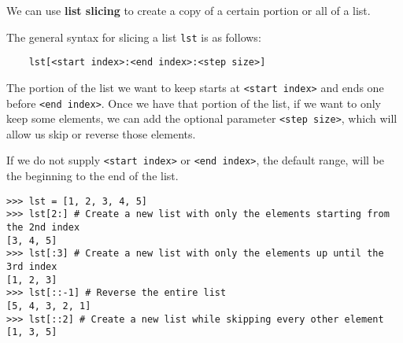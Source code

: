 We can use \textbf{list slicing} to create a copy of a certain portion or all of a list.

The general syntax for slicing a list \lstinline{lst} is as follows:

\begin{lstlisting}
	lst[<start index>:<end index>:<step size>]
\end{lstlisting}

The portion of the list we want to keep starts at \lstinline{<start index>} and ends one before
\lstinline{<end index>}. Once we have that portion of the list, if we want to only keep some elements, we can
add the optional parameter \lstinline{<step size>}, which will allow us skip or reverse those elements.

If we do not supply \lstinline{<start index>} or \lstinline{<end index>}, the default range, will be the
beginning to the end of the list. 

\begin{lstlisting}
>>> lst = [1, 2, 3, 4, 5]
>>> lst[2:] # Create a new list with only the elements starting from the 2nd index
[3, 4, 5]
>>> lst[:3] # Create a new list with only the elements up until the 3rd index
[1, 2, 3]
>>> lst[::-1] # Reverse the entire list
[5, 4, 3, 2, 1]
>>> lst[::2] # Create a new list while skipping every other element
[1, 3, 5]
\end{lstlisting}

